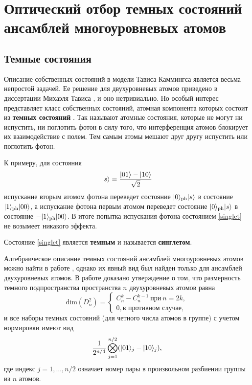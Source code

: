 \chapter{Оптический отбор темных состояний ансамблей многоуровневых атомов}\label{ch:ch3}

\section{Темные состояния}\label{subsec:ch3/sect1}

Описание собственных состояний в модели Тависа-Каммингса является весьма непростой задачей. Ее решение для двухуровневых атомов приведено в диссертации Михаэля Тависа \cite{tc_a_study}, и оно нетривиально. Но особый интерес представляет класс собственных состояний, атомная компонента которых состоит из \textbf{темных состояний} \cite{dark_states_dimension}. Так называют атомные состояния, которые не могут ни испустить, ни поглотить фотон в силу того, что интерференция атомов блокирует их взаимодействие с полем. Тем самым атомы мешают друг другу испустить или поглотить фотон.

К примеру, для состояния
\begin{equation}\label{singlet}
	|s\rangle = \frac{|01\rangle - |10\rangle}{\sqrt{2}}
\end{equation}
испускание вторым атомом фотона переведет состояние  $|0\rangle_{\text{ph}}|s\rangle$ в состояние $|1\rangle_{\text{ph}}|00\rangle$, а испускание фотона первым атомом переведет состояние  $|0\rangle_{\text{ph}}|s\rangle$ в состояние $-|1\rangle_{\text{ph}}|00\rangle$. В итоге попытка испускания фотона состоянием \eqref{singlet} не возымеет никакого эффекта.

Состояние \eqref{singlet} является \textbf{темным} и называется \textbf{синглетом}.

Алгебраическое описание темных состояний ансамблей многоуровневых атомов можно найти в работе \cite{dark_states_kok}, однако их явный вид был найден только для ансамблей двухуровневых атомов. В работе \cite{dark_states_dimension} доказано утверждение о том, что размерность темного подпространства пространства $n$ двухуровневых атомов равна
\begin{equation}
\mathrm{dim}(D_{n}^2) =
\begin{cases}
	C_{n}^{k} - C_{n}^{k-1}~\text{при}~n = 2k, \\
	0, \text{в противном случае},
\end{cases}
\end{equation}
и все наборы темных состояний (для четного числа атомов в группе) с учетом нормировки имеют вид 
\begin{equation}
\frac{1}{2^{n/4}}\bigotimes_{j=1}^{n/2}(|01\rangle_{j}-|10\rangle_{j}),
\end{equation}
где индекс $j = 1,\dots, n/2$ означает номер пары в произвольном разбиении группы из $n$ атомов.

